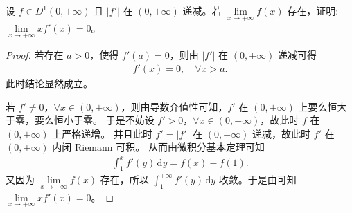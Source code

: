 \documentclass[../../main.tex]{subfiles}
\begin{document}
\begin{example}
设 \(f\in D^{1}(0,+\infty)\) 且 \(|f'|\) 在 \((0,+\infty)\) 递减。若 \(\lim\limits_{x \to +\infty} f(x)\) 存在，证明: \(\lim\limits_{x \to +\infty} x f'(x)=0\)。 
\end{example}
\begin{proof}
若存在 \(a > 0\)，使得 \(f'(a) = 0\)，则由 \(|f'|\) 在 \((0, +\infty)\) 递减可得
\begin{align*}
f'(x) = 0, \quad \forall x > a.
\end{align*}
此时结论显然成立。

若 \(f' \neq 0\)，\(\forall x \in (0, +\infty)\)，则由导数介值性可知，\(f'\) 在 \((0, +\infty)\) 上要么恒大于零，要么恒小于零。
于是不妨设 \(f' > 0\)，\(\forall x \in (0, +\infty)\)，故此时 \(f\) 在 \((0, +\infty)\) 上严格递增。
并且此时 \(f' = |f'|\) 在 \((0, +\infty)\) 递减，故此时 \(f'\) 在 \((0, +\infty)\) 内闭 Riemann 可积。
从而由微积分基本定理可知
\begin{align*}
\int_1^x f'(y) \, \mathrm{d}y = f(x) - f(1).
\end{align*}
又因为 \(\lim\limits_{x \to +\infty} f(x)\) 存在，所以 \(\int_1^{+\infty} f'(y) \, \mathrm{d}y\) 收敛。于是由可知 \(\lim\limits_{x \to +\infty} x f'(x) = 0\)。

\end{proof}
\end{document}
